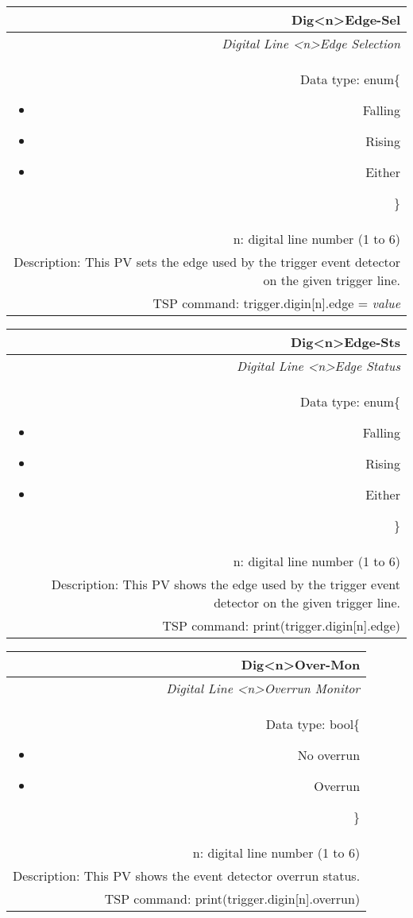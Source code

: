 \documentclass[openany]{article}
\begin{document}
		\begin{tabular}{N}
			\hline
			\bfseries Dig{\textless n\textgreater}Edge-Sel\label{pv:digedge-sel} \\ \hline
			\emph{Digital Line \textless n\textgreater Edge Selection} \\
			Data type: enum\{\begin{itemize}[noitemsep]
				\small
				\item[] Falling
				\item[] Rising
				\item[] Either
			\end{itemize}\} \\
			n: digital line number (1 to 6) \\
			Description: This PV sets the edge used by the trigger event detector on the given trigger line. \\
			TSP command: trigger.digin[n].edge = \emph{value}
		\end{tabular}

		\begin{tabular}{N}
			\hline
			\bfseries Dig{\textless n\textgreater}Edge-Sts\label{pv:digedge-sts} \\ \hline
			\emph{Digital Line \textless n\textgreater Edge Status} \\
			Data type: enum\{\begin{itemize}[noitemsep]
				\small
				\item[] Falling
				\item[] Rising
				\item[] Either
			\end{itemize}\} \\
			n: digital line number (1 to 6) \\
			Description: This PV shows the edge used by the trigger event detector on the given trigger line. \\
			TSP command: print(trigger.digin[n].edge)
		\end{tabular}

		\begin{tabular}{N}
			\hline
			\bfseries Dig{\textless n\textgreater}Over-Mon\label{pv:digover-mon} \\ \hline
			\emph{Digital Line \textless n\textgreater Overrun Monitor} \\
			Data type: bool\{\begin{itemize}[noitemsep]
				\small
				\item[] No overrun
				\item[] Overrun
			\end{itemize}\} \\
			n: digital line number (1 to 6) \\
			Description: This PV shows the event detector overrun status. \\
			TSP command: print(trigger.digin[n].overrun)
		\end{tabular}
\end{document}
